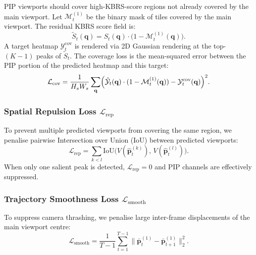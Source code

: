 \documentclass[preprint,12pt]{elsarticle}
\begin{document}
PIP viewports should cover high-KBRS-score regions not already covered by 
the main viewport. Let $\mathcal{M}^{(1)}_t$ be the binary mask of tiles 
covered by the main viewport. The residual KBRS score field is:
\begin{equation}
  \tilde{S}_t(\mathbf{q}) = S_t(\mathbf{q}) \cdot 
    \bigl(1 - \mathcal{M}^{(1)}_t(\mathbf{q})\bigr).
  \label{eq:residual_kbrs}
\end{equation}
A target heatmap $\mathcal{Y}^{\text{cov}}_t$ is rendered via 2D Gaussian 
rendering at the top-$(K-1)$ peaks of $\tilde{S}_t$. The coverage loss is 
the mean-squared error between the PIP portion of the predicted heatmap and 
this target:
\begin{equation}
  \mathcal{L}_{\text{cov}} = \frac{1}{H_s W_s}\sum_{\mathbf{q}}
    \Bigl(\hat{\mathcal{Y}}_t(\mathbf{q})\cdot
      (1-\mathcal{M}^{(1)}_t(\mathbf{q})) 
      - \mathcal{Y}^{\text{cov}}_t(\mathbf{q})\Bigr)^2.
  \label{eq:cov_loss}
\end{equation}

\subsubsection{Spatial Repulsion Loss $\mathcal{L}_{\text{rep}}$}

To prevent multiple predicted viewports from covering the same region, we 
penalise pairwise Intersection over Union (IoU) between predicted viewports:
\begin{equation}
  \mathcal{L}_{\text{rep}} = \sum_{k < l} 
    \text{IoU}\!\bigl(V(\hat{\mathbf{p}}^{(k)}_t),\,
                      V(\hat{\mathbf{p}}^{(l)}_t)\bigr).
  \label{eq:rep_loss}
\end{equation}
When only one salient peak is detected, $\mathcal{L}_{\text{rep}} = 0$ and 
PIP channels are effectively suppressed.

\subsubsection{Trajectory Smoothness Loss $\mathcal{L}_{\text{smooth}}$}

To suppress camera thrashing, we penalise large inter-frame displacements 
of the main viewport centre:
\begin{equation}
  \mathcal{L}_{\text{smooth}} = \frac{1}{T-1}\sum_{t=1}^{T-1}
    \bigl\|\bar{\mathbf{p}}^{(1)}_t - \bar{\mathbf{p}}^{(1)}_{t+1}\bigr\|_2^2.
  \label{eq:smooth_loss}
\end{equation}
\end{document}

